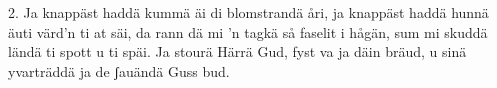 2.  Ja knappäst haddä kummä äi di blomstrandä åri,
    ja knappäst haddä hunnä äuti värd'n ti at säi,
    da rann dä mi 'n tagkä så faselit i hågän,
    sum mi skuddä ländä ti spott u ti späi.
    Ja stourä Härrä Gud, fyst va ja däin bräud,
    u sinä yvarträddä ja de ʃauändä Guss bud.

